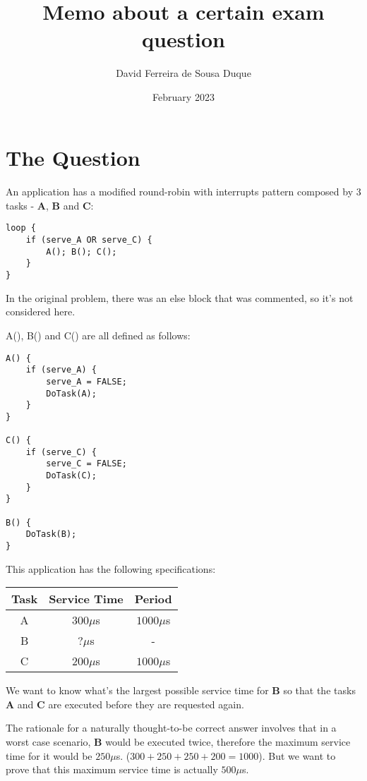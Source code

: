\documentclass{article}
\title{Memo about a certain exam question}
\author{David Ferreira de Sousa Duque}
\date{February 2023}
\begin{document}
\maketitle

\section{The Question}
\paragraph{}

An application has a modified round-robin with interrupts pattern composed by 3 tasks - \textbf{A}, \textbf{B} and \textbf{C}:
\begin{lstlisting}
loop {
    if (serve_A OR serve_C) {
        A(); B(); C();
    }
}
\end{lstlisting}

In the original problem, there was an else block that was commented, so it's not considered here.

A(), B() and C() are all defined as follows:
\begin{lstlisting}
A() {
    if (serve_A) {
        serve_A = FALSE;
        DoTask(A);
    }
}

C() {
    if (serve_C) {
        serve_C = FALSE;
        DoTask(C);
    }
}

B() {
    DoTask(B);
}
\end{lstlisting}

This application has the following specifications:

\begin{table}[H]
\centering
 \begin{tabular}{||c | c | c||} 
 \hline
 Task & Service Time & Period \\ [0.5ex] 
 \hline\hline
 A & $300 \mu$s & $1000 \mu$s \\ 
 B & $? \mu$s & - \\
 C & $200 \mu$s & $1000 \mu$s \\ [1ex] 
 \hline
 \end{tabular}
\end{table}

We want to know what's the largest possible service time for \textbf{B} so that the tasks \textbf{A} and \textbf{C} are executed before they are requested again.

The rationale for a naturally thought-to-be correct answer involves that in a worst case scenario, \textbf{B} would be executed twice, therefore the maximum service time for it would be $250 \mu$s. ($300 + 250 + 250 + 200 = 1000$). But we want to prove that this maximum service time is actually $500 \mu$s.
\end{document}
